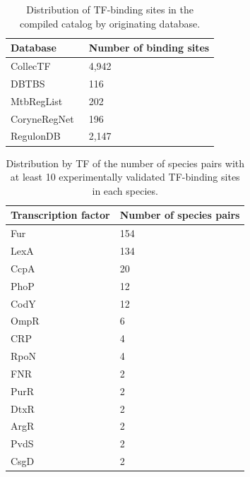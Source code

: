 \begin{table}
\caption{Distribution of TF-binding sites in the compiled catalog by
originating database.}
\label{tab:database-numbers}
\centering
\begin{tabular}{l l}
\toprule
Database & Number of binding sites \\
\midrule
CollecTF~\cite{kilic2013collectf} & 4,942 \\
DBTBS~\cite{sierro2008dbtbs} & 116 \\
MtbRegList~\cite{jacques2005mtbreglist} & 202 \\
CoryneRegNet~\cite{pauling2012coryneregnet} & 196 \\
RegulonDB~\cite{salgado2013regulondb} & 2,147 \\
\bottomrule
\end{tabular}
\end{table}

\begin{table}
\centering
\caption{Distribution by TF of the number of species pairs with at least 10
  experimentally validated TF-binding sites in each species.}
\label{tab:number-of-species-pairs}

\begin{tabular}{l l}
\toprule
Transcription factor & Number of species pairs \\
\midrule
  Fur & 154 \\
  LexA & 134 \\
  CcpA & 20 \\
  PhoP & 12 \\
  CodY & 12 \\
  OmpR & 6 \\
  CRP & 4 \\
  RpoN & 4 \\
  FNR & 2 \\
  PurR & 2 \\
  DtxR & 2 \\
  ArgR & 2 \\
  PvdS & 2 \\
  CsgD & 2 \\
\bottomrule
\end{tabular}
\end{table}

